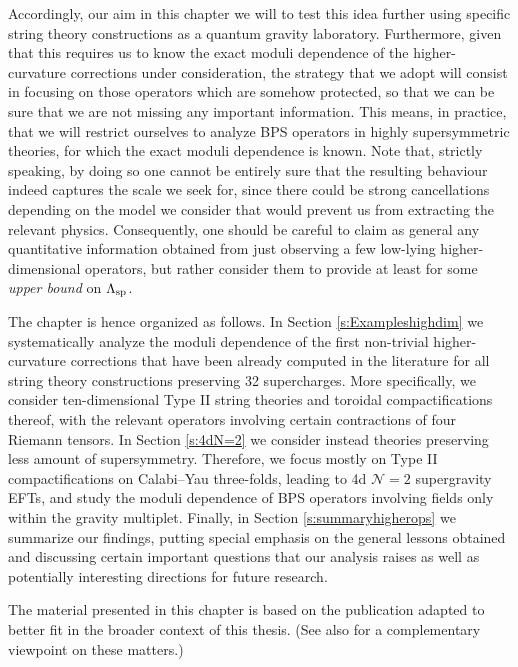 Accordingly, our aim in this chapter we will to test this idea further using specific string theory constructions as a quantum gravity laboratory. Furthermore, given that this requires us to know the exact moduli dependence of the higher-curvature corrections under consideration, the strategy that we adopt will consist in focusing on those operators which are somehow protected, so that we can be sure that we are not missing any important information. This means, in practice, that we will restrict ourselves to analyze BPS operators in highly supersymmetric theories, for which the exact moduli dependence is known. Note that, strictly speaking, by doing so one cannot be entirely sure that the resulting behaviour indeed captures the scale we seek for, since there could be strong cancellations depending on the model we consider that would prevent us from extracting the relevant physics. Consequently, one should be careful to claim as general any quantitative information obtained from just observing a few low-lying higher-dimensional operators, but rather consider them to provide at least for some \emph{upper bound} on $\Lambda_{\text{sp}}$. %

The chapter is hence organized as follows. In Section \ref{s:Exampleshighdim} we systematically analyze the moduli dependence of the first non-trivial higher-curvature corrections that have been already computed in the literature for all string theory constructions preserving 32 supercharges. More specifically, we consider ten-dimensional Type II string theories and toroidal compactifications thereof, with the relevant operators involving certain contractions of four Riemann tensors. In Section \ref{s:4dN=2} we consider instead theories preserving less amount of supersymmetry. Therefore, we focus mostly on Type II compactifications on Calabi--Yau three-folds, leading to 4d $\mathcal{N}=2$ supergravity EFTs, and study the moduli dependence of BPS operators involving fields only within the gravity multiplet. Finally, in Section \ref{s:summaryhigherops} we summarize our findings, putting special emphasis on the general lessons obtained and discussing certain important questions that our analysis raises as well as potentially interesting directions for future research. 

The material presented in this chapter is based on the publication \cite{Castellano:2023aum} adapted to better fit in the broader context of this thesis. (See also \cite{vandeHeisteeg:2023dlw} for a complementary viewpoint on these matters.)


